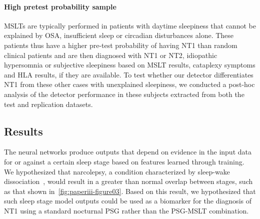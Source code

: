 \paragraph{High pretest probability sample}
\Acp{MSLT} are typically performed in patients with daytime sleepiness that cannot be explained by \ac{OSA}, insufficient sleep or circadian disturbances alone. 
These patients thus have a higher pre-test probability of having \ac{NT1} than random clinical patients and are then diagnosed with \ac{NT1} or \ac{NT2}, idiopathic hypersomnia or subjective sleepiness based on \ac{MSLT} results, cataplexy symptoms and \ac{HLA} results, if they are available.
To test whether our detector differentiates \ac{NT1} from these other cases with unexplained sleepiness, we conducted a post-hoc analysis of the detector performance in these subjects extracted from both the test and replication datasets.

\subsection{Results}

The neural networks produce outputs that depend on evidence in the input data for or against a certain sleep stage based on features learned through training.
We hypothesized that narcolepsy, a condition characterized by sleep-wake dissociation~\cite{Christensen2015a,Olsen2017,Jensen2014,Vassalli2013,Pizza2015}, would result in a greater than normal overlap between stages, such as that shown in~\cref{fig:paperiii-figure03}.
Based on this result, we hypothesized that such sleep stage model outputs could be used as a biomarker for the diagnosis of \ac{NT1} using a standard nocturnal \ac{PSG} rather than the \ac{PSG}-\ac{MSLT} combination.

